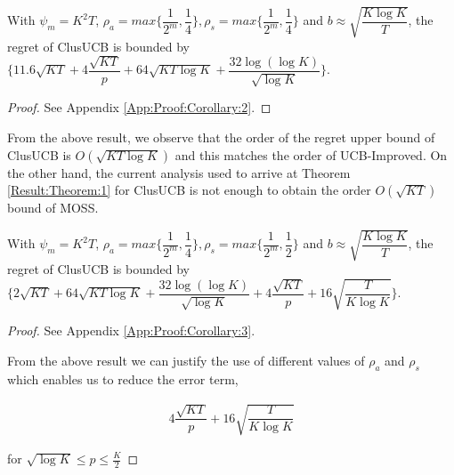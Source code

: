 \begin{corollary}
\label{Result:Corollary:2}
With $\psi_{m}=K^{2}T$, $\rho_{a}=max\bigg\lbrace\dfrac{1}{2^{m}},\dfrac{1}{4}\bigg\rbrace,\rho_{s}=max\bigg\lbrace\dfrac{1}{2^{m}},\dfrac{1}{4}\bigg\rbrace $ and $b\approx\sqrt{\dfrac{K\log K}{T}}$, the regret of ClusUCB is bounded  by $\bigg\lbrace 11.6\sqrt{KT} + 4\dfrac{\sqrt{KT}}{p} + 64\sqrt{KT\log K} + \dfrac{32\log{(\log K)}}{\sqrt{\log K}}\bigg\rbrace$.
\end{corollary}
\begin{proof}
 See Appendix \ref{App:Proof:Corollary:2}.
\end{proof}

From the above result, we observe that the order of the regret upper bound of ClusUCB is $O(\sqrt{KT\log K})$ and this matches the order of UCB-Improved. On the other hand, the current analysis used to arrive at Theorem \ref{Result:Theorem:1} for ClusUCB is not enough to obtain the order $O(\sqrt{KT})$ bound of MOSS.

\begin{corollary}
\label{Result:Corollary:2}
With $\psi_{m}=K^{2}T$, $\rho_{a}=max\bigg\lbrace\dfrac{1}{2^{m}},\dfrac{1}{4}\bigg\rbrace,\rho_{s}=max\bigg\lbrace\dfrac{1}{2^{m}},\dfrac{1}{2}\bigg\rbrace $ and $b\approx\sqrt{\dfrac{K\log K}{T}}$, the regret of ClusUCB is bounded  by $\bigg\lbrace 2\sqrt{KT} + 64\sqrt{KT\log K} + \dfrac{32\log{(\log K)}}{\sqrt{\log K}} + 4\dfrac{\sqrt{KT}}{p}  + 16\sqrt{\dfrac{T}{K\log K}}\bigg\rbrace$.
\end{corollary}
\begin{proof}
 See Appendix \ref{App:Proof:Corollary:3}.
 
From the above result we can justify the use of different values of $\rho_{a}$ and $\rho_{s}$ which enables us to reduce the error term,

\begin{align*}
4\dfrac{\sqrt{KT}}{p} + 16\sqrt{\dfrac{T}{K\log K}}
\end{align*}

for $ \sqrt{\log K} \leq p\leq\frac{K}{2}$

\end{proof}





